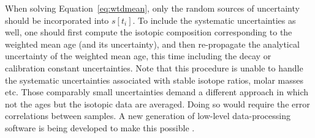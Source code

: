 \begin{refsection}
When solving Equation~\ref{eq:wtdmean}, only the random sources of
uncertainty should be incorporated into $s[t_i]$.  To include the
systematic uncertainties as well, one should first compute the
isotopic composition corresponding to the weighted mean age (and its
uncertainty), and then re-propagate the analytical uncertainty of the
weighted mean age, this time including the decay or calibration
constant uncertainties. Note that this procedure is unable to handle
the systematic uncertainties associated with stable isotope ratios,
molar masses etc. Those comparably small uncertainties demand a
different approach in which not the ages but the isotopic data are
averaged.  Doing so would require the error correlations between
samples. A new generation of low-level data-processing software is
being developed to make this possible
\citep{vermeesch2015b,mclean2016}.


\end{refsection}
